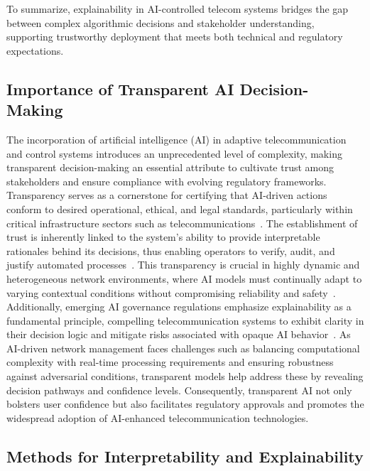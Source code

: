 \documentclass[sigconf]{acmart}
\begin{document}
To summarize, explainability in AI-controlled telecom systems bridges the gap between complex algorithmic decisions and stakeholder understanding, supporting trustworthy deployment that meets both technical and regulatory expectations.

\subsection{Importance of Transparent AI Decision-Making}

The incorporation of artificial intelligence (AI) in adaptive telecommunication and control systems introduces an unprecedented level of complexity, making transparent decision-making an essential attribute to cultivate trust among stakeholders and ensure compliance with evolving regulatory frameworks. Transparency serves as a cornerstone for certifying that AI-driven actions conform to desired operational, ethical, and legal standards, particularly within critical infrastructure sectors such as telecommunications~\cite{ref7,ref13}. The establishment of trust is inherently linked to the system’s ability to provide interpretable rationales behind its decisions, thus enabling operators to verify, audit, and justify automated processes~\cite{ref15}. This transparency is crucial in highly dynamic and heterogeneous network environments, where AI models must continually adapt to varying contextual conditions without compromising reliability and safety~\cite{ref48}. Additionally, emerging AI governance regulations emphasize explainability as a fundamental principle, compelling telecommunication systems to exhibit clarity in their decision logic and mitigate risks associated with opaque AI behavior~\cite{ref50}. As AI-driven network management faces challenges such as balancing computational complexity with real-time processing requirements and ensuring robustness against adversarial conditions, transparent models help address these by revealing decision pathways and confidence levels. Consequently, transparent AI not only bolsters user confidence but also facilitates regulatory approvals and promotes the widespread adoption of AI-enhanced telecommunication technologies.

\subsection{Methods for Interpretability and Explainability}
\end{document}
